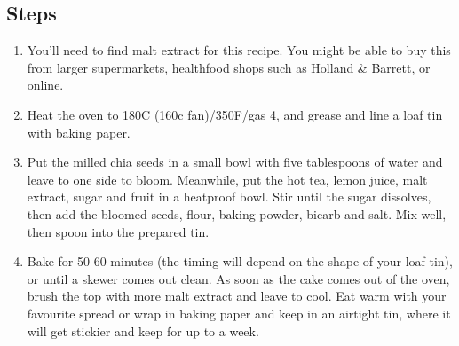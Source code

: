 \documentclass{book}
\begin{document}
\subsection*{Steps}
\begin{enumerate}
\item You’ll need to find malt extract for this recipe. You might be able to buy this from larger supermarkets, healthfood shops such as Holland \& Barrett, or online.
\item Heat the oven to 180C (160c fan)/350F/gas 4, and grease and line a loaf tin with baking paper.
\item Put the milled chia seeds in a small bowl with five tablespoons of water and leave to one side to bloom. Meanwhile, put the hot tea, lemon juice, malt extract, sugar and fruit in a heatproof bowl. Stir until the sugar dissolves, then add the bloomed seeds, flour, baking powder, bicarb and salt. Mix well, then spoon into the prepared tin.
\item Bake for 50-60 minutes (the timing will depend on the shape of your loaf tin), or until a skewer comes out clean. As soon as the cake comes out of the oven, brush the top with more malt extract and leave to cool. Eat warm with your favourite spread or wrap in baking paper and keep in an airtight tin, where it will get stickier and keep for up to a week.
\end{enumerate}
\newpage
\end{document}

